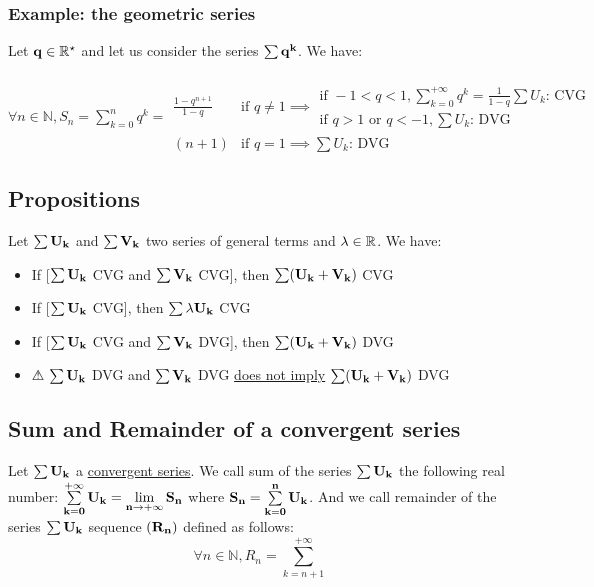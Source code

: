 \documentclass[notitlepage]{math}
\begin{document}
\subsubsection{Example: the geometric series}
Let $\bf q \in \mathbb{R}^\star$ and let us consider the series $\bf \sum q^k$. We have:\\
\\
    $\forall n \in \mathbb{N}, S_n = \sum\limits_{k=0}^n q^k = \begin{array}{|ll}
        \frac{1 - q^{n+1}}{1 - q} & \text{if } q \neq 1  \implies
        \begin{array}{|l}
            \text{if } \minus 1 < q < 1, \sum\limits_{k=0}^{+\infty} q^k = \frac{1}{1-q} \sum U_k \text{: CVG} \\
            \text{if } q > 1 \text{ or } q < \minus 1, \sum U_k \text{: DVG} 
        \end{array} \\
        (n + 1) & \text{if } q = 1 \implies \sum U_k \text{: DVG}
    \end{array}$

\subsection{Propositions}
Let $\bf \sum U_k$ and $\bf \sum V_k$ two series of general terms and $\bf \lambda \in \mathbb{R}$. We have:
\begin{itemize}
    \item If [$\bf \sum U_k$ CVG and $\bf \sum V_k$ CVG], then $\bf \sum (U_k + V_k)$ CVG
    \item If [$\bf \sum U_k$ CVG], then $\bf \sum \lambda U_k$ CVG
    \item If [$\bf \sum U_k$ CVG and $\bf \sum V_k$ DVG], then $\bf \sum (U_k + V_k)$ DVG
    \item ⚠ $\bf \sum U_k$ DVG and $\bf \sum V_k$ DVG \underline{does not imply} $\bf \sum (U_k + V_k)$ DVG
\end{itemize}

\subsection{Sum and Remainder of a convergent series}
Let $\bf \sum U_k$ a \underline{convergent series}. We call sum of the series $\bf \sum U_k$ 
the following real number: $\bf \sum\limits_{k=0}^{+\infty} U_k = \lim\limits_{n \to +\infty} S_n$ where $\bf {S_n} = \sum\limits_{k=0}^n U_k$.
And we call remainder of the series $\bf \sum U_k$ sequence $\bf (R_n)$ defined as follows:
\[ \forall n \in \mathbb{N}, R_n = \sum\limits_{k=n+1}^{+\infty}\]
\end{document}
